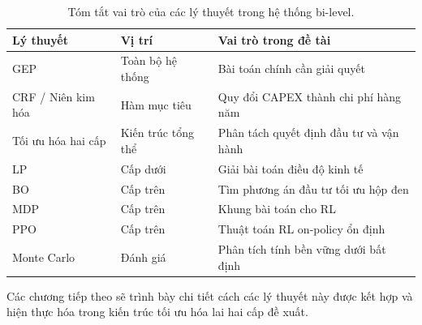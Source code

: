 \begin{table}[H]
\centering
\begin{tabular}{p{4.5cm}p{3cm}p{6cm}}
\toprule
\textbf{Lý thuyết} & \textbf{Vị trí} & \textbf{Vai trò trong đề tài} \\
\midrule
GEP & Toàn bộ hệ thống & Bài toán chính cần giải quyết \\
CRF / Niên kim hóa & Hàm mục tiêu & Quy đổi CAPEX thành chi phí hàng năm \\
Tối ưu hóa hai cấp & Kiến trúc tổng thể & Phân tách quyết định đầu tư và vận hành \\
LP & Cấp dưới & Giải bài toán điều độ kinh tế \\
BO & Cấp trên & Tìm phương án đầu tư tối ưu hộp đen \\
MDP & Cấp trên & Khung bài toán cho RL \\
PPO & Cấp trên & Thuật toán RL on-policy ổn định \\
Monte Carlo & Đánh giá & Phân tích tính bền vững dưới bất định \\
\bottomrule
\end{tabular}
\caption{Tóm tắt vai trò của các lý thuyết trong hệ thống bi-level.}
\label{tab:theory_summary}
\end{table}

Các chương tiếp theo sẽ trình bày chi tiết cách các lý thuyết này được kết hợp và hiện thực hóa trong kiến trúc tối ưu hóa lai hai cấp đề xuất.
